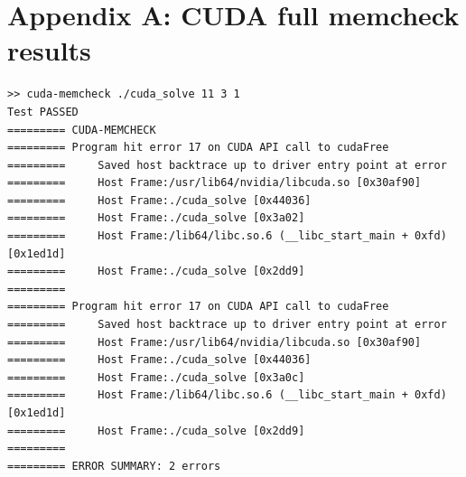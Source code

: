 \documentclass[12pt]{article}
\begin{document}



\newpage
\section{Appendix A: CUDA full memcheck results}

\begin{verbatim}
>> cuda-memcheck ./cuda_solve 11 3 1
Test PASSED
========= CUDA-MEMCHECK
========= Program hit error 17 on CUDA API call to cudaFree
=========     Saved host backtrace up to driver entry point at error
=========     Host Frame:/usr/lib64/nvidia/libcuda.so [0x30af90]
=========     Host Frame:./cuda_solve [0x44036]
=========     Host Frame:./cuda_solve [0x3a02]
=========     Host Frame:/lib64/libc.so.6 (__libc_start_main + 0xfd) [0x1ed1d]
=========     Host Frame:./cuda_solve [0x2dd9]
=========
========= Program hit error 17 on CUDA API call to cudaFree
=========     Saved host backtrace up to driver entry point at error
=========     Host Frame:/usr/lib64/nvidia/libcuda.so [0x30af90]
=========     Host Frame:./cuda_solve [0x44036]
=========     Host Frame:./cuda_solve [0x3a0c]
=========     Host Frame:/lib64/libc.so.6 (__libc_start_main + 0xfd) [0x1ed1d]
=========     Host Frame:./cuda_solve [0x2dd9]
=========
========= ERROR SUMMARY: 2 errors
\end{verbatim}
\end{document}
